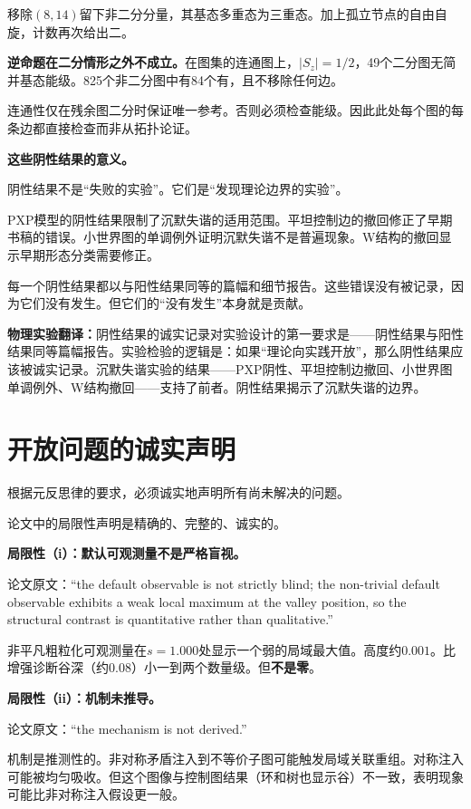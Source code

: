 \documentclass[11pt,a4paper]{book}
\theoremstyle{definition}
\begin{document}
移除$(8,14)$留下非二分分量，其基态多重态为三重态。加上孤立节点的自由自旋，计数再次给出二。

\textbf{逆命题在二分情形之外不成立。}在图集的连通图上，$|S_z|=1/2$，49个二分图无简并基态能级。825个非二分图中有84个有，且不移除任何边。

连通性仅在残余图二分时保证唯一参考。否则必须检查能级。因此此处每个图的每条边都直接检查而非从拓扑论证。

\textbf{这些阴性结果的意义。}

阴性结果不是“失败的实验”。它们是“发现理论边界的实验”。

PXP模型的阴性结果限制了沉默失谐的适用范围。平坦控制边的撤回修正了早期书稿的错误。小世界图的单调例外证明沉默失谐不是普遍现象。W结构的撤回显示早期形态分类需要修正。

每一个阴性结果都以与阳性结果同等的篇幅和细节报告。这些错误没有被记录，因为它们没有发生。但它们的“没有发生”本身就是贡献。

\textbf{物理实验翻译：}阴性结果的诚实记录对实验设计的第一要求是——阴性结果与阳性结果同等篇幅报告。实验检验的逻辑是：如果“理论向实践开放”，那么阴性结果应该被诚实记录。沉默失谐实验的结果——PXP阴性、平坦控制边撤回、小世界图单调例外、W结构撤回——支持了前者。阴性结果揭示了沉默失谐的边界。

\section{开放问题的诚实声明}

根据元反思律的要求，必须诚实地声明所有尚未解决的问题。

论文中的局限性声明是精确的、完整的、诚实的。

\textbf{局限性（i）：默认可观测量不是严格盲视。}

论文原文：“the default observable is not strictly blind; the non-trivial default observable exhibits a weak local maximum at the valley position, so the structural contrast is quantitative rather than qualitative.”

非平凡粗粒化可观测量在$s=1.000$处显示一个弱的局域最大值。高度约$0.001$。比增强诊断谷深（约$0.08$）小一到两个数量级。但\textbf{不是零}。

\textbf{局限性（ii）：机制未推导。}

论文原文：“the mechanism is not derived.”

机制是推测性的。非对称矛盾注入到不等价子图可能触发局域关联重组。对称注入可能被均匀吸收。但这个图像与控制图结果（环和树也显示谷）不一致，表明现象可能比非对称注入假设更一般。
\end{document}
